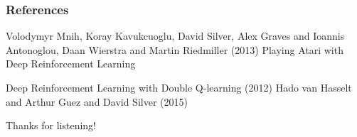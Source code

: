 \documentclass{beamer}
\begin{document}
\begin{frame}
\frametitle{References}
\footnotesize{
\begin{thebibliography}{99} %
 Volodymyr Mnih, Koray Kavukcuoglu, David Silver, Alex Graves and Ioannis Antonoglou, Daan Wierstra and Martin Riedmiller (2013)
\newblock Playing Atari with Deep Reinforcement Learning


 Deep Reinforcement Learning with Double Q-learning (2012)
\newblock Hado van Hasselt and Arthur Guez and David Silver (2015)
\end{thebibliography}
}
\end{frame}


\begin{frame}
\Huge{\centerline{Thanks for listening!}}
\end{frame}

\end{document}
